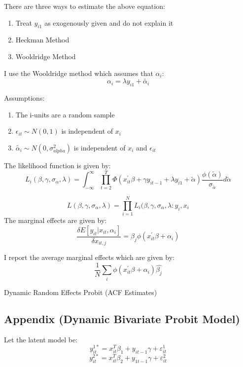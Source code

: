 \documentclass[12pt]{article}
\begin{document}
There are three ways to estimate the above equation: 
\begin{enumerate}
\item Treat $y_{i1}$ as exogenously given and do not explain it
\item Heckman Method
\item Wooldridge Method
\end{enumerate} 
I use the Wooldridge method which assumes that $\alpha_{i}$:
$$\alpha_{i} = \lambda y_{i1} + \tilde{\alpha_{i}}$$

Assumptions: 

\begin{enumerate}
\item The i-units are a random sample
\item $\epsilon_{it} \sim N(0,1)$ is independent of $x_{i}$
\item $\tilde{\alpha_{i}} \sim N(0,\sigma_{alpha}^{2})$ is independent of
  $x_{i}$ and $\epsilon_{it}$
\end{enumerate}

The likelihood function is given by:
$$ L_{i}(\beta, \gamma, \sigma_{\alpha},\lambda)= \int_{-\infty}^{\infty}
\prod_{t=2}^{T}\Phi(x^{'}_{it}\beta + \gamma y_{it-1} + \lambda y_{i1} +
\tilde{\alpha}) \frac{\phi(\tilde{\alpha})}{\sigma_{\tilde{\alpha}}}
d\tilde{\alpha}$$ 

$$ L(\beta, \gamma, \sigma_{\alpha},\lambda) = \prod_{i=1}^{N}L_{i}(\beta, \gamma, \sigma_{\alpha},\lambda:y_{i},x_{i}$$
The marginal effects are given by:
\begin{equation}
\frac{\delta E[y_{it}|x_{it}, \alpha_{i}]}{\delta x_{it,j}} =
\beta_{j}\phi(x_{it}^{'} \beta + \alpha_{i})
\end{equation}

I report the average marginal effects which are given by: 
$$ \frac{1}{N} \sum_{i}\phi( x_{it}^{'} \beta + \alpha_{i})
\hat{\beta_{j}}$$

\begin{center}
\begin{table}[H]
\caption{Dynamic Random Effects Probit (ACF Estimates)}
\label{tab:dynprobitacf}

\end{table}
\end{center}
\restoregeometry
\subsection{Appendix (Dynamic Bivariate Probit Model)}\label{apendix:bivariate}
Let the latent model be: 
$$y^{1*}_{it}= x_{it}^{T}\beta_{1} + y_{it-1}\gamma + \varepsilon_{it}^{1}$$
$$y^{2*}_{it}= x_{it}^{T}\beta_{2} +y_{1t-1}\gamma + \varepsilon_{it}^{2}$$
\end{document}
